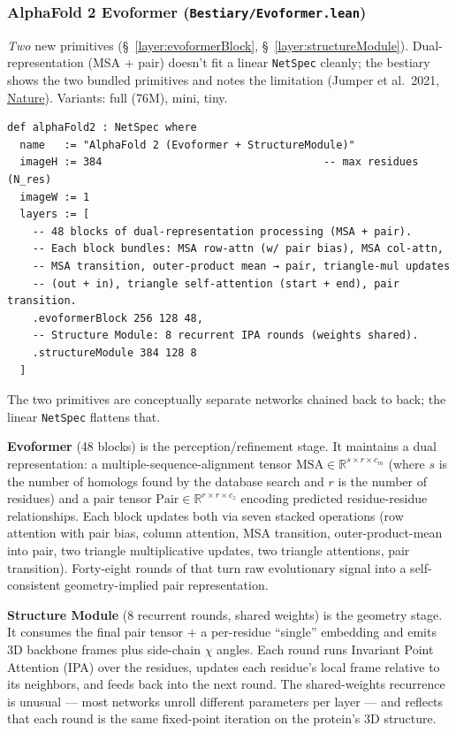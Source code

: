 \subsubsection*{AlphaFold 2 Evoformer (\texttt{Bestiary/Evoformer.lean})}
\emph{Two} new primitives (\S~\ref{layer:evoformerBlock},
\S~\ref{layer:structureModule}). Dual-representation (MSA + pair)
doesn't fit a linear \texttt{NetSpec} cleanly; the bestiary shows the
two bundled primitives and notes the limitation (Jumper et al.\ 2021,
\href{https://www.nature.com/articles/s41586-021-03819-2}{Nature}). Variants: full (76M), mini, tiny.


\begin{verbatim}
def alphaFold2 : NetSpec where
  name   := "AlphaFold 2 (Evoformer + StructureModule)"
  imageH := 384                                   -- max residues (N_res)
  imageW := 1
  layers := [
    -- 48 blocks of dual-representation processing (MSA + pair).
    -- Each block bundles: MSA row-attn (w/ pair bias), MSA col-attn,
    -- MSA transition, outer-product mean → pair, triangle-mul updates
    -- (out + in), triangle self-attention (start + end), pair transition.
    .evoformerBlock 256 128 48,
    -- Structure Module: 8 recurrent IPA rounds (weights shared).
    .structureModule 384 128 8
  ]
\end{verbatim}

The two primitives are conceptually separate networks chained back to
back; the linear \texttt{NetSpec} flattens that.

\textbf{Evoformer} (48 blocks) is the perception/refinement stage. It
maintains a dual representation: a multiple-sequence-alignment
tensor $\mathrm{MSA}\!\in\!\mathbb{R}^{s \times r \times c_m}$ (where
$s$ is the number of homologs found by the database search and $r$ is
the number of residues) and a pair tensor
$\mathrm{Pair}\!\in\!\mathbb{R}^{r \times r \times c_z}$ encoding
predicted residue-residue relationships. Each block updates both via
seven stacked operations (row attention with pair bias, column
attention, MSA transition, outer-product-mean into pair, two triangle
multiplicative updates, two triangle attentions, pair transition).
Forty-eight rounds of that turn raw evolutionary signal into a
self-consistent geometry-implied pair representation.

\textbf{Structure Module} (8 recurrent rounds, shared weights) is the
geometry stage. It consumes the final pair tensor + a per-residue
``single'' embedding and emits 3D backbone frames plus side-chain
$\chi$ angles. Each round runs Invariant Point Attention (IPA) over
the residues, updates each residue's local frame relative to its
neighbors, and feeds back into the next round. The shared-weights
recurrence is unusual --- most networks unroll different parameters
per layer --- and reflects that each round is the same fixed-point
iteration on the protein's 3D structure.

